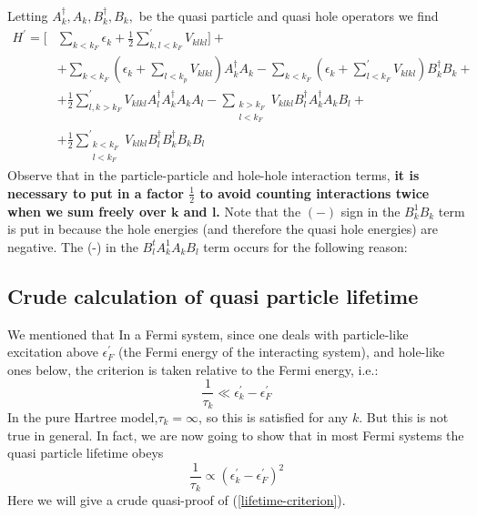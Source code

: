 Letting $A_{k}^{\dagger}, A_{k}, B_{k}^{\dagger}, B_{k},$ be the quasi particle and quasi hole operators we find
\begin{equation}\begin{aligned}
H^{\prime}=[&\sum_{k<k_{F}} \epsilon_{k}+\frac{1}{2} \sum_{k,l<k_F}^{\prime} V_{k l k l}]+\\
&+\sum_{k<k_{F}}\left(\epsilon_{k}+\sum_{l<k_{p}} V_{k l k l}\right) A_{k}^{\dagger} A_{k}-\sum_{k<k_{F}}\left(\epsilon_{k}+\sum_{l<k_{F}}^{\prime} V_{klkl}\right) B_{k}^{\dagger} B_{k}+\\
&+\frac{1}{2} \sum_{l,k>k_{F}}^{\prime} V_{kl k l} A_{l}^{\dagger} A_{k}^{\dagger} A_{k} A_{l}-\sum_{\substack{k>k_{F}\\l<k_F}} V_{k l k l} B_{l}^{\dagger} A_{k}^{\dagger} A_{k} B_{l}+\\
&+\frac{1}{2} \sum_{\substack{k<k_F\\l<k_F}}^{\prime} V_{klkl} B_{l}^{\dagger} B_{k}^{\dagger} B_{k} B_{l}
\end{aligned}\end{equation}
Observe that in the particle-particle and hole-hole interaction terms, \textbf{it is necessary to put in a factor $\frac{1}{2}$ to avoid counting interactions twice when we sum freely over $\mathbf{k}$ and $\mathbf{l}$.} Note that the $(-)$ sign in the $B_{k}^{1} B_{k}$ term is put in because the hole energies (and therefore the quasi hole energies) are negative. The (-) in the $B_{l}^{t} A_{k}^{1} A_{k} B_{l}$ term occurs for the following reason: 

\subsection{Crude calculation of quasi particle lifetime}
We mentioned that  In a Fermi system, since one deals with particle-like excitation above $\epsilon_F^{\prime}$ (the Fermi energy of the interacting system), and hole-like ones below, the criterion is taken relative to the Fermi energy, i.e.:
\begin{equation}\frac{1}{\tau_{k}} \ll \epsilon_{k}^{\prime}-\epsilon_{F}^{\prime}\end{equation}
In the pure Hartree model,$\tau_k=\infty$, so this is satisfied for any $k$. But this is not true in general. In fact, we are now going to show that in most Fermi systems the quasi particle lifetime obeys
\begin{equation}\frac{1}{\tau_{k}} \propto\left(\epsilon_{k}^{\prime}-\epsilon_{F}^{\prime}\right)^{2}
\label{lifetime-criterion}
\end{equation}
Here we will give a crude quasi-proof of (\ref{lifetime-criterion}).


